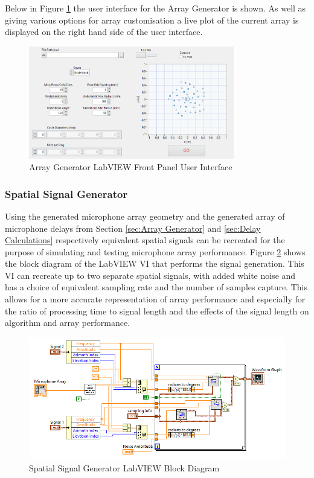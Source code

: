\documentclass{UoNMCHA}
\numberwithin{equation}{section}
\begin{document}
    Below in Figure \ref{fig:ArrayGenPanel} the user interface for the Array Generator is shown. As well as giving various options for array customisation a live plot of the current array is displayed on the right hand side of the user interface.  
    
    \begin{figure}[H]
        \centering
        \includegraphics[keepaspectratio, width = 0.8\textwidth]{Figures/ArrayGenPanel.png}
        \caption{Array Generator LabVIEW Front Panel User Interface}
        \label{fig:ArrayGenPanel}
    \end{figure}
    
\subsubsection{Spatial Signal Generator} \label{sec:Signal Generator}
    Using the generated microphone array geometry and the generated array of microphone delays from Section \ref{sec:Array Generator} and \ref{sec:Delay Calculations} respectively equivalent spatial signals can be recreated for the purpose of simulating and testing microphone array performance. Figure \ref{fig:SignalGenBlock} shows the block diagram of the LabVIEW VI that performs the signal generation. This VI can recreate up to two separate spatial signals, with added white noise and has a choice of equivalent sampling rate and the number of samples capture. This allows for a more accurate representation of array performance and especially for the ratio of processing time to signal length and the effects of the signal length on algorithm and array performance. 
    
    \begin{figure}[H]
        \centering
        \includegraphics[keepaspectratio, width = \textwidth]{Figures/SignalGenBlock.png}
        \caption{Spatial Signal Generator LabVIEW Block Diagram}
        \label{fig:SignalGenBlock}
    \end{figure}    
    
\end{document}
